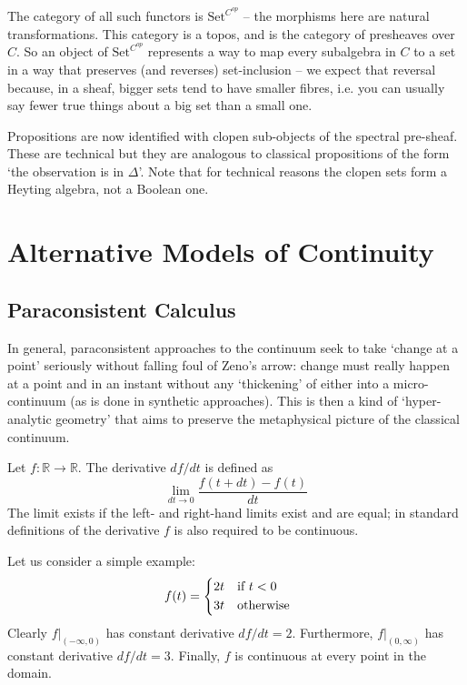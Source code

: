 \documentclass[oneside,english]{article}
\theoremstyle{plain}
\theoremstyle{definition}
\theoremstyle{definition}
\begin{document}
The category of all such functors is $\text{Set}^{C^{op}}$ -- the morphisms here are natural transformations. This category is a topos, and is the category of presheaves over $C$. So an object of $\text{Set}^{C^{op}}$ represents a way to map every subalgebra in $C$ to a set in a way that preserves (and reverses) set-inclusion -- we expect that reversal because, in a sheaf, bigger sets tend to have smaller fibres, i.e. you can usually say fewer true things about a big set than a small one.

Propositions are now identified with clopen sub-objects of the spectral pre-sheaf. These are technical but they are analogous to classical propositions of the form `the observation is in $\Delta$'. Note that for technical reasons the clopen sets form a Heyting algebra, not a Boolean one.

\section{Alternative Models of Continuity}

\subsection{Paraconsistent Calculus}

In general, paraconsistent approaches to the continuum seek to take `change at a point' seriously without falling foul of Zeno's arrow: change must really happen at a point and in an instant without any `thickening' of either into a micro-continuum (as is done in synthetic approaches). This is then a kind of `hyper-analytic geometry' that aims to preserve the metaphysical picture of the classical continuum.

Let $f:\mathbb{R}\to \mathbb{R}$. The derivative $df/dt$ is defined as
\[
	\lim_{dt\to 0} \frac{f(t + dt) - f(t)}{dt}	
\]
The limit exists if the left- and right-hand limits exist and are equal; in standard definitions of the derivative $f$ is also required to be continuous. 

Let us consider a simple example:
\[
	\begin{split}
		f(t) &= 
			\begin{cases*}
				2t & if $t < 0$ \\
				3t & otherwise
			\end{cases*}
	\end{split}
\]
Clearly $f|_(-\infty, 0)$ has constant derivative $df/dt = 2$. Furthermore, $f|_(0, \infty)$ has constant derivative $df/dt = 3$. Finally, $f$ is continuous at every point in the domain.
\end{document}
